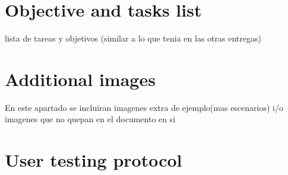 \documentclass[10pt,a4paper,twocolumn,twoside]{article}
\begin{document}
	\appendix
	
	\section{Objective and tasks list}
	lista de tareas y objetivos (similar a lo que tenia en las otras entregas)
	
	\section{Additional images}
	En este apartado se incluiran imagenes extra de ejemplo(mas escenarios) i/o imagenes que no quepan en el documento en si

	\section{User testing protocol}
\end{document}
